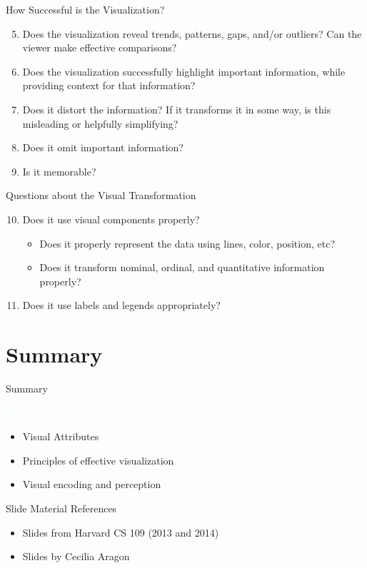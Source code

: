 \documentclass{beamer}
\newcommand{\tblue}[1]{{\Large {\textcolor{azure}{#1}}}}
\begin{document}
\begin{frame}{How Successful is the Visualization?} 
    \begin{enumerate}
        \setcounter{enumi}{4}
        \item Does the visualization reveal trends, patterns, gaps, and/or outliers? Can the viewer make effective comparisons?
        \item Does the visualization successfully highlight important information, while providing context for that information?
        \item Does it distort the information? If it transforms it in some way, is this misleading or helpfully simplifying?
        \item Does it omit important information?
        \item Is it memorable?
    \end{enumerate}
\end{frame}  

\begin{frame}{Questions about the Visual Transformation} 
    \begin{enumerate}
        \setcounter{enumi}{9}
        \item Does it use visual components properly?
        \begin{itemize}
            \item Does it properly represent the data using lines, color, position, etc?
            \item Does it transform nominal, ordinal, and quantitative information properly?
        \end{itemize}
        \item Does it use labels and legends appropriately?
    \end{enumerate}
\end{frame}  



\section{Summary}

\begin{frame}{Summary}

\tblue{Major Concepts:}
\begin{itemize}
    \item Visual Attributes
    \item Principles of effective visualization
    \item Visual encoding and perception
\end{itemize}
\end{frame}

\begin{frame}{Slide Material References}

\begin{itemize}
    \item Slides from Harvard CS 109 (2013 and 2014)
    \item Slides by Cecilia Aragon
\end{itemize}
\end{frame}
\end{document}
